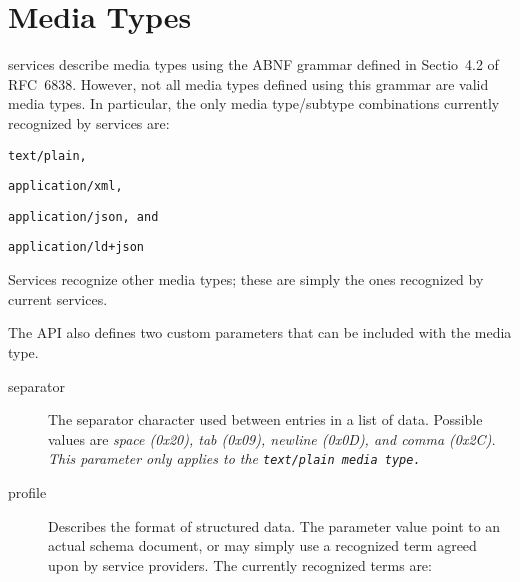 
\section{Media Types}\label{sec:media}

\lapps services describe media types using the ABNF grammar  defined in Sectio~4.2 of RFC~6838\cite{rfc6838}. However, not all media types defined using this grammar are valid \lapps media types.  In particular, the only media type/subtype combinations currently recognized by \lapps services are:
\begin{listing}
\item \tt{text/plain},
\item \tt{application/xml},
\item \tt{application/json}, and
\item \tt{application/ld+json}
\end{listing}

Services \may recognize other media types; these are simply the ones recognized by current \lapps services.

The \lapps API also defines two custom parameters that can be included with the media type.

\begin{description}
\item[separator] The separator character used between entries in a list of data. Possible values are \it{space} (0x20), \it{tab} (0x09), \it{newline} (0x0D), and \it{comma} (0x2C). This parameter only applies to the \tt{text/plain} media type.
\item[profile] Describes the format of structured data.  The parameter value \may point to an actual schema document, or may simply use a recognized term agreed upon by service providers.  The currently recognized terms are:
\end{description}

